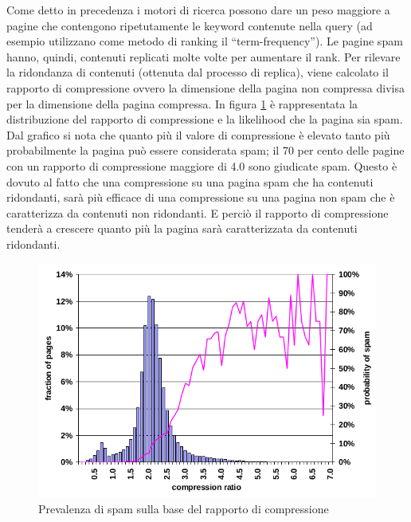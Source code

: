 Come detto in precedenza i  motori di ricerca possono dare un peso maggiore a pagine che contengono ripetutamente le keyword contenute nella query (ad esempio utilizzano come metodo di ranking il ``term-frequency''). Le pagine spam hanno, quindi,  contenuti replicati molte volte per aumentare il rank. Per rilevare la ridondanza di contenuti (ottenuta dal processo di replica), viene calcolato il rapporto di compressione ovvero la dimensione della pagina non compressa divisa per la dimensione della pagina compressa. In figura \ref{fig:fetterly8} è rappresentata la distribuzione del rapporto di compressione e la likelihood che la pagina sia spam. Dal grafico si nota che quanto più il valore di compressione è elevato tanto più probabilmente la pagina può essere considerata spam; il 70 per cento delle pagine con un rapporto di compressione maggiore di 4.0 sono giudicate spam. Questo è dovuto al fatto che una compressione su una pagina spam che ha contenuti ridondanti, sarà più efficace di una compressione su una 
pagina non spam che è caratterizza da contenuti non ridondanti. E perciò il rapporto di compressione tenderà a crescere quanto più la pagina sarà caratterizzata da contenuti ridondanti.
\begin{figure}[htbp]
\centering
\includegraphics[width=12cm]{immagini/fetterly/fetterly8}
\caption{Prevalenza di spam sulla base del rapporto di compressione}
\label{fig:fetterly8}
\end{figure}

